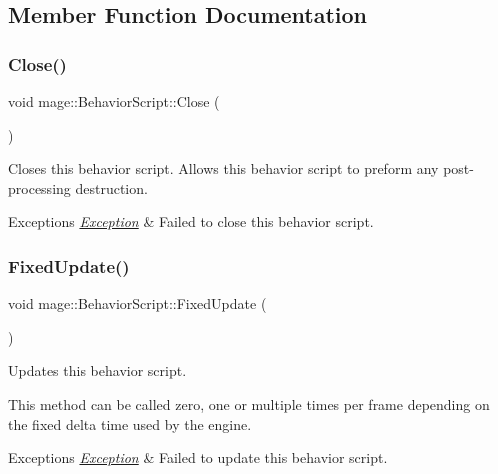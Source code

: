 \subsection{Member Function Documentation}
\hypertarget{classmage_1_1_behavior_script_aaf2b9f6666064f5b6a6e21b7f1623584}{}\label{classmage_1_1_behavior_script_aaf2b9f6666064f5b6a6e21b7f1623584} 
\subsubsection{\texorpdfstring{Close()}{Close()}}
{\footnotesize\ttfamily void mage\+::\+Behavior\+Script\+::\+Close (\begin{DoxyParamCaption}{ }\end{DoxyParamCaption})\hspace{0.3cm}{\ttfamily [virtual]}}

Closes this behavior script. Allows this behavior script to preform any post-\/processing destruction.


\begin{DoxyExceptions}{Exceptions}
{\em \hyperlink{classmage_1_1_exception}{Exception}} & Failed to close this behavior script. \\
\hline
\end{DoxyExceptions}
\hypertarget{classmage_1_1_behavior_script_a8318f79ab78798ec37b39bc844f7138c}{}\label{classmage_1_1_behavior_script_a8318f79ab78798ec37b39bc844f7138c} 
\subsubsection{\texorpdfstring{Fixed\+Update()}{FixedUpdate()}}
{\footnotesize\ttfamily void mage\+::\+Behavior\+Script\+::\+Fixed\+Update (\begin{DoxyParamCaption}{ }\end{DoxyParamCaption})\hspace{0.3cm}{\ttfamily [virtual]}}

Updates this behavior script.

This method can be called zero, one or multiple times per frame depending on the fixed delta time used by the engine.


\begin{DoxyExceptions}{Exceptions}
{\em \hyperlink{classmage_1_1_exception}{Exception}} & Failed to update this behavior script. \\
\hline
\end{DoxyExceptions}
\hypertarget{classmage_1_1_behavior_script_a06521eef472f2d878a9f652b95b723a8}{}\label{classmage_1_1_behavior_script_a06521eef472f2d878a9f652b95b723a8} 

